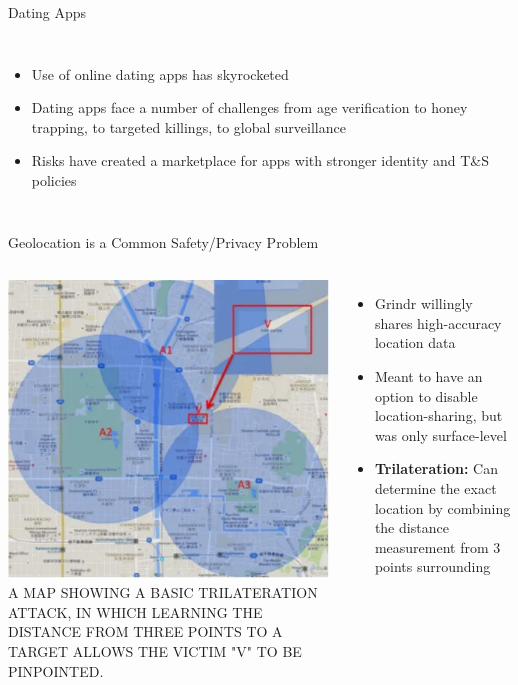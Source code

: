 \documentclass[nobackground,dvipsnames,table,aspectratio=169]{beamer}
\begin{document}
\begin{frame}{Dating Apps}
\begin{columns}
            \begin{itemize}
                \item Use of online dating apps has skyrocketed
                \item Dating apps face a number of challenges from age verification to honey trapping, to targeted killings, to global surveillance 
                \item Risks have created a marketplace for apps with stronger identity and T\&S policies
            \end{itemize}
    \end{columns}
\end{frame}

\begin{frame}{Geolocation is a Common Safety/Privacy Problem}
    \begin{columns}
            \includegraphics[width=\textwidth]{trilateration}
            \scriptsize
            A MAP SHOWING A BASIC TRILATERATION ATTACK, IN WHICH LEARNING THE DISTANCE FROM THREE POINTS TO A TARGET ALLOWS THE VICTIM "V" TO BE PINPOINTED.
            \begin{itemize}
                \item Grindr willingly shares high-accuracy location data
                \item Meant to have an option to disable location-sharing, but was only surface-level
                \item \textbf{Trilateration:} Can determine the exact location by combining the distance measurement from 3 points surrounding
            \end{itemize}
    \end{columns}
\end{frame}
\end{document}
